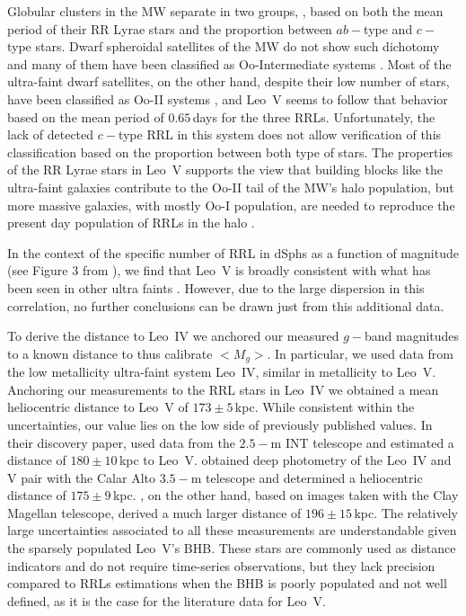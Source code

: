 \documentclass[iop]{emulateapj}
\begin{document}
Globular clusters in the MW separate in two groups, \citep[the Oosterhoff, Oo, groups;][]{Oosterhoff1939}, based on both the mean period of their RR Lyrae stars and the proportion between $ab-$type and $c-$type stars. 
Dwarf spheroidal satellites of the MW do not show such dichotomy and many of them have been classified as Oo-Intermediate systems \citep{catelan09,catelan15}. 
Most of the ultra-faint dwarf satellites, on the other hand, despite their low number of stars, have been classified as Oo-II systems \citep[][and references therein]{clementini14}, and Leo~V seems to follow that behavior based on the mean period of $0.65$\,days for the three RRLs.
Unfortunately, the lack of detected $c-$type RRL in this system does not allow verification of this classification based on the proportion between both type of stars.
The properties of the RR Lyrae stars in Leo~V supports the view that building blocks like the ultra-faint galaxies contribute to the Oo-II tail of the MW's halo population, but more massive galaxies, with mostly Oo-I population, are needed to reproduce the present day population of RRLs in the halo \citep{zinn14,fiorentino15,Vivas2016}.
        
In the context of the specific number of RRL in dSphs as a function of magnitude (see Figure 3 from \citealt{Baker2015}), we find that Leo~V is broadly consistent with what has been seen in other ultra faints \citep{Vivas2016}.
However, due to the large dispersion in this correlation, no further conclusions can be drawn just from this additional data.

To derive the distance to Leo~IV we anchored our measured $g-$band magnitudes to a known distance to thus calibrate $<M_g>$. 
In particular, we used data from the low metallicity ultra-faint system Leo~IV, similar in metallicity to Leo~V.
Anchoring our measurements to the RRL stars in Leo~IV \citep{Moretti2009} we obtained a mean heliocentric distance to Leo~V of $173\pm5$\,kpc. 
While consistent within the uncertainties, our value lies on the low side of previously published values.
In their discovery paper, \citet{belokurov08a} used data from the $2.5-$m INT telescope and estimated a distance of $180\pm10$\,kpc to Leo~V. 
\citet{deJong2010} obtained deep photometry of the Leo~IV and V pair with the Calar Alto $3.5-$m telescope and determined a heliocentric distance of $175\pm9$\,kpc.
\citet{Sand2012}, on the other hand, based on images taken with the Clay Magellan telescope, derived a much larger distance of $196 \pm 15$\,kpc. 
The relatively large uncertainties associated to all these measurements are understandable given the sparsely populated Leo~V's BHB. These stars are commonly used as distance indicators and do not require time-series observations, but they lack precision compared to RRLs estimations when the BHB is poorly populated and not well defined, as it is the case for the literature data for Leo~V.
\end{document}
